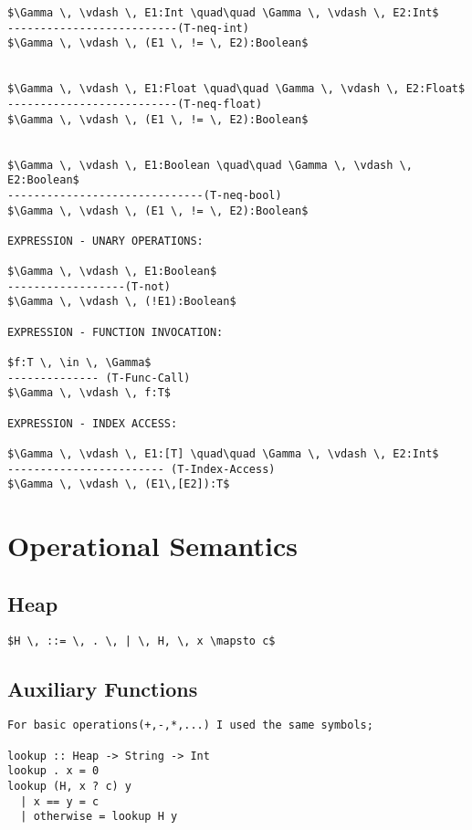 \documentclass[11pt, a4paper]{article}
\begin{document}
\begin{lstlisting}
$\Gamma \, \vdash \, E1:Int \quad\quad \Gamma \, \vdash \, E2:Int$
--------------------------(T-neq-int)
$\Gamma \, \vdash \, (E1 \, != \, E2):Boolean$


$\Gamma \, \vdash \, E1:Float \quad\quad \Gamma \, \vdash \, E2:Float$
--------------------------(T-neq-float)
$\Gamma \, \vdash \, (E1 \, != \, E2):Boolean$


$\Gamma \, \vdash \, E1:Boolean \quad\quad \Gamma \, \vdash \, E2:Boolean$
------------------------------(T-neq-bool)
$\Gamma \, \vdash \, (E1 \, != \, E2):Boolean$

EXPRESSION - UNARY OPERATIONS:

$\Gamma \, \vdash \, E1:Boolean$
------------------(T-not)
$\Gamma \, \vdash \, (!E1):Boolean$

EXPRESSION - FUNCTION INVOCATION:

$f:T \, \in \, \Gamma$
-------------- (T-Func-Call)
$\Gamma \, \vdash \, f:T$

EXPRESSION - INDEX ACCESS:

$\Gamma \, \vdash \, E1:[T] \quad\quad \Gamma \, \vdash \, E2:Int$
------------------------ (T-Index-Access)
$\Gamma \, \vdash \, (E1\,[E2]):T$
\end{lstlisting}
\section{Operational Semantics}
\subsection*{Heap}
\begin{lstlisting}
$H \, ::= \, . \, | \, H, \, x \mapsto c$
\end{lstlisting}
\subsection*{Auxiliary Functions}
\begin{lstlisting}
For basic operations(+,-,*,...) I used the same symbols;

lookup :: Heap -> String -> Int
lookup . x = 0
lookup (H, x ? c) y
  | x == y = c
  | otherwise = lookup H y
\end{lstlisting}
\end{document}
